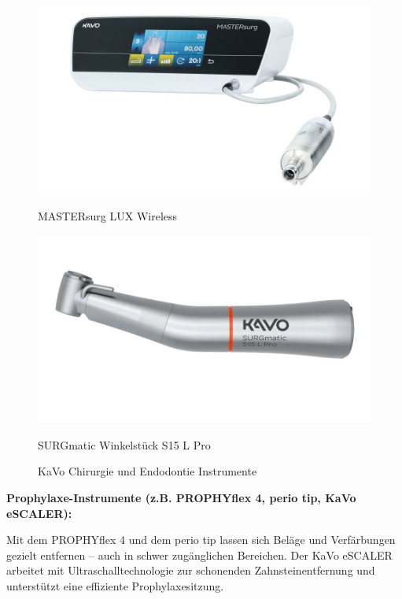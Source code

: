 \begin{figure}[H]
  \centering
  \begin{minipage}[b]{0.45\textwidth}
    \centering
    \includegraphics[width=\textwidth]{images/MASTERsurg_Motor_persp-transparent_3000px.jpg}
    \caption*{MASTERsurg LUX Wireless}
  \end{minipage}
  \hspace{0.05\textwidth}
  \begin{minipage}[b]{0.45\textwidth}
    \centering
    \includegraphics[width=\textwidth]{images/SURGmatic-S15L-Pro_transparent-1700px.jpg}
    \caption*{SURGmatic Winkelstück S15 L Pro}
  \end{minipage}
  \caption{KaVo Chirurgie und Endodontie Instrumente}
  \label{fig:Chirurgie und Endodontie Instrumente}
\end{figure}
\vspace{1em}

\textbf{Prophylaxe-Instrumente (z.B. PROPHYflex 4, perio tip, KaVo eSCALER):}

Mit dem PROPHYflex 4 und dem perio tip lassen sich Beläge und Verfärbungen gezielt entfernen – auch in schwer zugänglichen Bereichen. Der KaVo eSCALER arbeitet mit Ultraschalltechnologie zur schonenden Zahnsteinentfernung und unterstützt eine effiziente Prophylaxesitzung.

